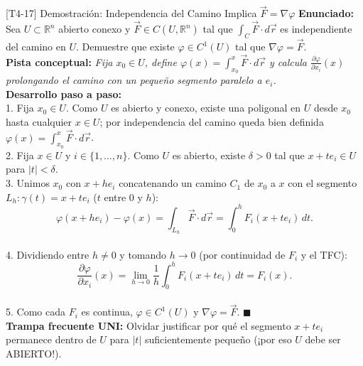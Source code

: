 \documentclass[11pt,a4paper]{article}
\begin{document}
\begin{ejerciciobox}{[T4-17] Demostración: Independencia del Camino Implica $\vec{F} = \nabla\varphi$}
\textbf{Enunciado:} Sea $U \subset \mathbb{R}^n$ abierto conexo y $\vec{F} \in C(U, \mathbb{R}^n)$ tal que $\int_C \vec{F}\cdot d\vec{r}$ es independiente del camino en $U$. Demuestre que existe $\varphi \in C^1(U)$ tal que $\nabla\varphi = \vec{F}$.\\[0.2cm]
\textbf{Pista conceptual:} \emph{Fija $x_0 \in U$, define $\varphi(x) = \int_{x_0}^x \vec{F}\cdot d\vec{r}$ y calcula $\frac{\partial\varphi}{\partial x_i}(x)$ prolongando el camino con un pequeño segmento paralelo a $e_i$.}\\[0.2cm]
\textbf{Desarrollo paso a paso:}\\
1. Fija $x_0 \in U$. Como $U$ es abierto y conexo, existe una poligonal en $U$ desde $x_0$ hasta cualquier $x \in U$; por independencia del camino queda bien definida $\varphi(x) = \int_{x_0}^x \vec{F}\cdot d\vec{r}$.\\
2. Fija $x \in U$ y $i \in \{1,\dots,n\}$. Como $U$ es abierto, existe $\delta > 0$ tal que $x + te_i \in U$ para $|t| < \delta$.\\
3. Unimos $x_0$ con $x+he_i$ concatenando un camino $C_1$ de $x_0$ a $x$ con el segmento $L_h: \gamma(t) = x + te_i$ ($t$ entre $0$ y $h$):\\
$$\varphi(x + he_i) - \varphi(x) = \int_{L_h} \vec{F}\cdot d\vec{r} = \int_0^h F_i(x + te_i)\,dt.$$\\
4. Dividiendo entre $h \neq 0$ y tomando $h \to 0$ (por continuidad de $F_i$ y el TFC):\\
$$\frac{\partial\varphi}{\partial x_i}(x) = \lim_{h\to 0}\frac{1}{h}\int_0^h F_i(x + te_i)\,dt = F_i(x).$$\\
5. Como cada $F_i$ es continua, $\varphi \in C^1(U)$ y $\nabla\varphi = \vec{F}$. $\blacksquare$\\[0.2cm]
\textbf{Trampa frecuente UNI:} Olvidar justificar por qué el segmento $x + te_i$ permanece dentro de $U$ para $|t|$ suficientemente pequeño (¡por eso $U$ debe ser ABIERTO!).
\end{ejerciciobox}
\end{document}
